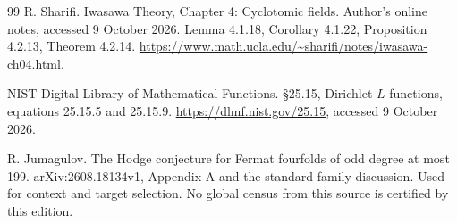 {\begin{thebibliography}{99}
R. Sharifi.
\newblock Iwasawa Theory, Chapter 4: Cyclotomic fields.
\newblock Author's online notes, accessed 9 October 2026.
\newblock Lemma 4.1.18, Corollary 4.1.22, Proposition 4.2.13, Theorem 4.2.14.
\newblock \url{https://www.math.ucla.edu/~sharifi/notes/iwasawa-ch04.html}.


NIST Digital Library of Mathematical Functions.
\newblock \S25.15, Dirichlet $L$-functions, equations 25.15.5 and 25.15.9.
\newblock \url{https://dlmf.nist.gov/25.15}, accessed 9 October 2026.


R. Jumagulov.
\newblock The Hodge conjecture for Fermat fourfolds of odd degree at most 199.
\newblock arXiv:2608.18134v1, Appendix A and the standard-family discussion.
\newblock Used for context and target selection. No global census from this source is certified by this edition.
\end{thebibliography}
}
